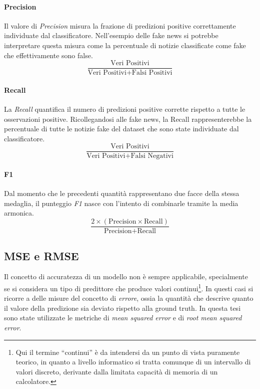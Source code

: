 \documentclass[12pt]{report}
\theoremstyle{definition}
\begin{document}
\paragraph{Precision}
Il valore di \textit{Precision} misura la frazione di predizioni positive correttamente individuate dal classificatore. Nell'esempio delle fake news si potrebbe interpretare questa misura come la percentuale di notizie classificate come fake che effettivamente sono false.
\begin{equation}
\frac{\text{Veri Positivi}}{\text{Veri Positivi} + \text{Falsi Positivi}}
\end{equation}

\paragraph{Recall}
La \textit{Recall} quantifica il numero di predizioni positive corrette rispetto a tutte le osservazioni positive. Ricollegandosi alle fake news, la Recall rappresenterebbe la percentuale di tutte le notizie fake del dataset che sono state individuate dal classificatore.
\begin{equation}
\frac{\text{Veri Positivi}}{\text{Veri Positivi} + \text{Falsi Negativi}}
\end{equation}

\paragraph{F1}
Dal momento che le precedenti quantità rappresentano due facce della stessa medaglia, il punteggio \textit{F1} nasce con l'intento di combinarle tramite la media armonica.
\begin{equation}
\frac{2 \times (\text{Precision} \times \text{Recall})}{\text{Precision} + \text{Recall}}
\end{equation}

\subsection{MSE e RMSE}\label{erroreregr}
Il concetto di accuratezza di un modello non è sempre applicabile, specialmente se si considera un tipo di predittore che produce valori continui\footnote{Qui il termine ``continui'' è da intendersi da un punto di vista puramente teorico, in quanto a livello informatico si tratta comunque di un intervallo di valori discreto, derivante dalla limitata capacità di memoria di un calcolatore.}. In questi casi si ricorre a delle misure del concetto di \textit{errore}, ossia la quantità che descrive quanto il valore della predizione sia deviato rispetto alla ground truth.
In questa tesi sono state utilizzate le metriche di \textit{mean squared error} e di \textit{root mean squared error}.
\end{document}

